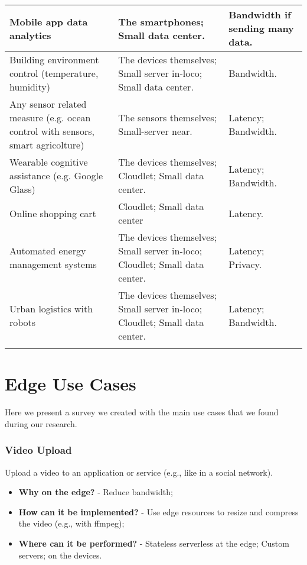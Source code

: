 \begin{tabularx}{\textwidth}{|X|X|X|}
Mobile app data analytics \cite{mobile-edge-survey}   & The smartphones; Small data center.   & Bandwidth if sending many data.   \\ \hline
Building environment control (temperature, humidity) \cite{mobile-edge-survey}   & The devices themselves; Small server in-loco; Small data center.   & Bandwidth.   \\ \hline
Any sensor related measure (e.g. ocean control with sensors, smart agricolture) \cite{mobile-edge-survey} \cite{how-to-deploy-fog-applications}   & The sensors themselves; Small-server near.   & Latency; Bandwidth.   \\ \hline
Wearable cognitive assistance (e.g. Google Glass) \cite{stream-processing-survey-resource-elasticity}   & The devices themselves; Cloudlet; Small data center.   & Latency; Bandwidth.   \\ \hline
Online shopping cart \cite{promise-of-edge-computing}   & Cloudlet; Small data center   & Latency.   \\ \hline
Automated energy management systems \cite{mobile-edge-survey}   & The devices themselves; Small server in-loco; Cloudlet; Small data center.   & Latency; Privacy.   \\ \hline
Urban logistics with robots \cite{context-aware-stream-processing}   & The devices themselves; Small server in-loco; Cloudlet; Small data center.   & Latency; Bandwidth.   \\ \hline
\caption{Survey on edge applications}
\label{tab:edge-applications}
\end{tabularx}


\section{Edge Use Cases}
Here we present a survey we created with the main use cases that we found during our research.


\subsubsection{Video Upload}
Upload a video to an application or service (e.g., like in a social network).
\begin{itemize}
    \item \textbf{Why on the edge?} - Reduce bandwidth;
    \item \textbf{How can it be implemented?} - Use edge resources to resize and compress the video (e.g., with ffmpeg);
    \item \textbf{Where can it be performed?} - Stateless serverless at the edge; Custom servers; on the devices.
\end{itemize}



